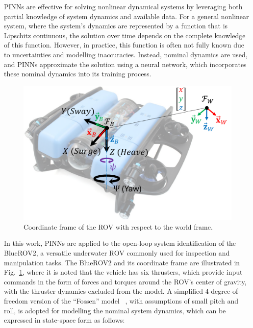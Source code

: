 \documentclass[conference]{IEEEtran}
\begin{document}
PINNs are effective for solving nonlinear dynamical systems by leveraging both partial knowledge of system dynamics and available data. For a general nonlinear system, where the system’s dynamics are represented by a function that is Lipschitz continuous, the solution over time depends on the complete knowledge of this function. However, in practice, this function is often not fully known due to uncertainties and modelling inaccuracies. Instead, nominal dynamics are used, and PINNs approximate the solution using a neural network, which incorporates these nominal dynamics into its training process. %
%
\begin{figure}[b!]
    \centering
    \includegraphics[width=0.95\columnwidth]{figs/rov_new.pdf}
    \caption{Coordinate frame of the ROV with respect to the world frame.}
    \label{fig:rov-coord-frame}
\end{figure}
%
In this work, PINNs are applied to the open-loop system identification of the BlueROV2, a versatile underwater ROV commonly used for inspection and manipulation tasks. The BlueROV2 and its coordinate frame are illustrated in Fig.~\ref{fig:rov-coord-frame}, where it is noted that the vehicle has six thrusters, which provide input commands in the form of forces and torques around the ROV's center of gravity, with the thruster dynamics excluded from the model. A simplified 4-degree-of-freedom version of the “Fossen” model ~\cite{fossen}, with assumptions of small pitch and roll, is adopted for modelling the nominal system dynamics, which can be expressed in state-space form as follows:
\end{document}
